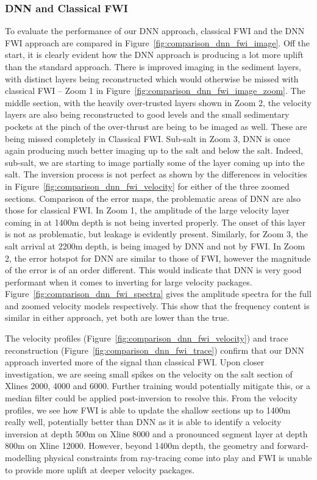 \subsubsection{DNN and Classical FWI}\label{sec:results_comparison_dnn_fwi}
To evaluate the performance of our DNN approach, classical FWI and the DNN FWI approach are compared in Figure~\ref{fig:comparison_dnn_fwi_image}. Off the start, it is clearly evident how the DNN approach is producing a lot more uplift than the standard approach. There is improved imaging in the sediment layers, with distinct layers being reconstructed which would otherwise be missed with classical FWI – Zoom 1 in Figure~\ref{fig:comparison_dnn_fwi_image_zoom}. The middle section, with the heavily over-trusted layers shown in Zoom 2, the velocity layers are also being reconstructed to good levels and the small sedimentary pockets at the pinch of the over-thrust are being to be imaged as well. These are being missed completely in Classical FWI. Sub-salt in Zoom 3, DNN is once again producing much better imaging up to the salt and below the salt. Indeed, sub-salt, we are starting to image partially some of the layer coming up into the salt. The inversion process is not perfect as shown by the differences in velocities in Figure~\ref{fig:comparison_dnn_fwi_velocity} for either of the three zoomed sections. Comparison of the error maps, the problematic areas of DNN are also those for classical FWI. In Zoom 1, the amplitude of the large velocity layer coming in at 1400m depth is not being inverted properly. The onset of this layer is not as problematic, but leakage is evidently present. Similarly, for Zoom 3, the salt arrival at 2200m depth, is being imaged by DNN and not by FWI. In Zoom 2, the error hotspot for DNN are similar to those of FWI, however the magnitude of the error is of an order different. This would indicate that DNN is very good performant when it comes to inverting for large velocity packages. Figure~\ref{fig:comparison_dnn_fwi_spectra} gives the amplitude spectra for the full and zoomed velocity models respectively. This show that the frequency content is similar in either approach, yet both are lower than the true.

The velocity profiles (Figure~\ref{fig:comparison_dnn_fwi_velocity}) and trace reconstruction (Figure~\ref{fig:comparison_dnn_fwi_trace}) confirm that our DNN approach inverted more of the signal than classical FWI. Upon closer investigation, we are seeing small spikes on the velocity on the salt section of Xlines 2000, 4000 and 6000. Further training would potentially mitigate this, or a median filter could be applied post-inversion to resolve this. From the velocity profiles, we see how FWI is able to update the shallow sections up to 1400m really well, potentially better than DNN as it is able to identify a velocity inversion at depth 500m on Xline 8000 and a pronounced segment layer at depth 800m on Xline 12000. However, beyond 1400m depth, the geometry and forward-modelling physical constraints from ray-tracing come into play and FWI is unable to provide more uplift at deeper velocity packages.

